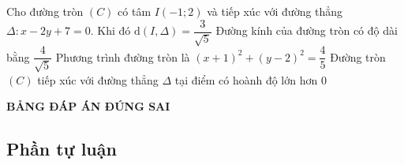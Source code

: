 \begin{ex}%
 	Cho đường tròn $(C)$ có tâm $I(-1;2)$ và tiếp xúc với đường thẳng $\Delta\colon x-2y+7=0$. Khi đó
 	\choiceTF
 	{$\mathrm{d}(I,\Delta)=\dfrac{3}{\sqrt{5}}$}
 	{\True Đường kính của đường tròn có độ dài bằng $\dfrac{4}{\sqrt{5}}$}
 	{\True Phương trình đường tròn là $(x+1)^2+(y-2)^2=\dfrac{4}{5}$}
 	{Đường tròn $(C)$ tiếp xúc với đường thẳng $\Delta$ tại điểm có hoành độ lớn hơn $0$} 
\end{ex}

\begin{center}
	\textbf{\textsf{BẢNG ĐÁP ÁN ĐÚNG SAI}}
\end{center}


\subsection{Phần tự luận}


